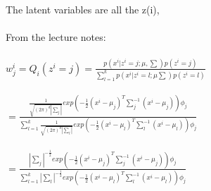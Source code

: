 \newcommand\tab[1][1cm]{\hspace*{#1}}
\begin{answer}
\\ \\
The latent variables are all the z(i), \\ \\
From the lecture notes: \\ \\
\tab$ w_j^i = Q_i(z^i = j ) = \frac{p(x^i|z^i=j;\mu,\sum)p(z^i = j)}{\sum_{l=1}^kp(x^i|z^i=l;\mu\sum)p(z^i=l)} $\\ \\
\tab[3cm]$ = \frac{  \frac{1}{ \sqrt{(2\pi)^d |\sum_j|}} exp( -\frac{1}{2} (x^i - \mu_j)^T \sum_j^{-1} (x^i - \mu_j)  )\phi_j } {\sum_{l=1}^k  \frac{1}{ \sqrt{(2\pi)^d |\sum_l|}} exp( -\frac{1}{2} (x^i - \mu_l)^T \sum_l^{-1} (x^i - \mu_l)  )\phi_j }$ \\ \\


\tab[3cm]$ = \frac{ |\sum_j|^{-\frac{1}{2}} exp( -\frac{1}{2} (x^i - \mu_j)^T \sum_j^{-1} (x^i - \mu_j)  )\phi_j } {\sum_{l=1}^k  |\sum_l|^{-\frac{1}{2}} exp( -\frac{1}{2} (x^i - \mu_l)^T \sum_l^{-1} (x^i - \mu_l)  )\phi_j }$ \\ \\


\end{answer}
